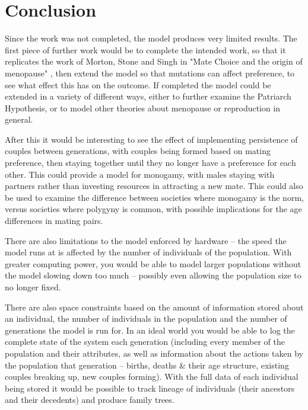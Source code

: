 \documentclass[authoryearcitations]{UoYCSproject}
\begin{document}
\chapter{Conclusion}
\label{cha:Conclusion}
Since the work was not completed, the model produces very limited results. The first piece of further work would be to complete the intended work, so that it replicates the work of Morton, Stone and Singh in "Mate Choice and the origin of menopause" \cite{mateChoice2013}, then extend the model so that mutations can affect preference, to see what effect this has on the outcome. If completed the model could be extended in a variety of different ways, either to further examine the Patriarch Hypothesis, or to model other theories about menopause or reproduction in general.

After this it would be interesting to see the effect of implementing persistence of couples between generations, with couples being formed based on mating preference, then staying together until they no longer have a preference for each other. This could provide a model for monogamy, with males staying with partners rather than investing resources in attracting a new mate. This could also be used to examine the difference between societies where monogamy is the norm, versus societies where polygyny is common, with possible implications for the age differences in mating pairs.

There are also limitations to the model enforced by hardware -- the speed the model runs at is affected by the number of individuals of the population. With greater computing power, you would be able to model larger populations without the model slowing down too much -- possibly even allowing the population size to no longer fixed. 

There are also space constraints based on the amount of information stored about an individual, the number of individuals in the population and the number of generations the model is run for. In an ideal world you would be able to log the complete state of the system each generation (including every member of the population and their attributes, as well as information about the actions taken by the population that generation -- births, deaths \& their age structure, existing couples breaking up, new couples forming). With the full data of each individual being stored it would be possible to track lineage of individuals (their ancestors and their decedents) and produce family trees. 
\end{document}
